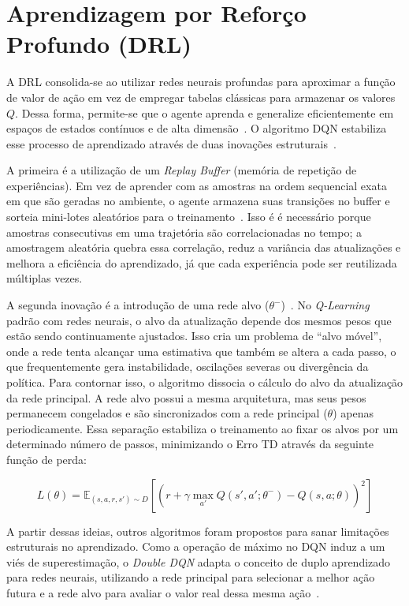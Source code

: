 \section*{Aprendizagem por Reforço Profundo (\texorpdfstring{\gls{DRL}}{\gls{DRL}})}

A \gls{DRL} consolida-se ao utilizar redes neurais profundas para aproximar a função de valor de ação em vez de empregar tabelas clássicas para armazenar os valores $Q$. Dessa forma, permite-se que o agente aprenda e generalize eficientemente em espaços de estados contínuos e de alta dimensão~\cite{mnih2015}. O algoritmo \gls{DQN} estabiliza esse processo de aprendizado através de duas inovações estruturais~\cite{mnih2015}.

A primeira é a utilização de um \textit{Replay Buffer} (memória de repetição de experiências). Em vez de aprender com as amostras na ordem sequencial exata em que são geradas no ambiente, o agente armazena suas transições no buffer e sorteia mini-lotes aleatórios para o treinamento~\cite{mnih2015}. Isso é é necessário porque amostras consecutivas em uma trajetória são correlacionadas no tempo; a amostragem aleatória quebra essa correlação, reduz a variância das atualizações e melhora a eficiência do aprendizado, já que cada experiência pode ser reutilizada múltiplas vezes.

A segunda inovação é a introdução de uma rede alvo ($\theta^-$)~\cite{mnih2015}. No \textit{\textit{Q-Learning}} padrão com redes neurais, o alvo da atualização depende dos mesmos pesos que estão sendo continuamente ajustados. Isso cria um problema de ``alvo móvel'', onde a rede tenta alcançar uma estimativa que também se altera a cada passo, o que frequentemente gera instabilidade, oscilações severas ou divergência da política. Para contornar isso, o algoritmo dissocia o cálculo do alvo da atualização da rede principal. A rede alvo possui a mesma arquitetura, mas seus pesos permanecem congelados e são sincronizados com a rede principal ($\theta$) apenas periodicamente. Essa separação estabiliza o treinamento ao fixar os alvos por um determinado número de passos, minimizando o Erro TD através da seguinte função de perda:

\begin{equation} 
L(\theta) = \mathbb{E}_{(s,a,r,s') \sim D} \left[ \left( r + \gamma \max_{a'} Q(s', a'; \theta^-) - Q(s, a; \theta) \right)^2 \right] 
\end{equation}

A partir dessas ideias, outros algoritmos foram propostos para sanar limitações estruturais no aprendizado. Como a operação de máximo no \gls{DQN} induz a um viés de superestimação, o \textit{Double DQN} adapta o conceito de duplo aprendizado para redes neurais, utilizando a rede principal para selecionar a melhor ação futura e a rede alvo para avaliar o valor real dessa mesma ação~\cite{hasselt2010double, mnih2015}.

